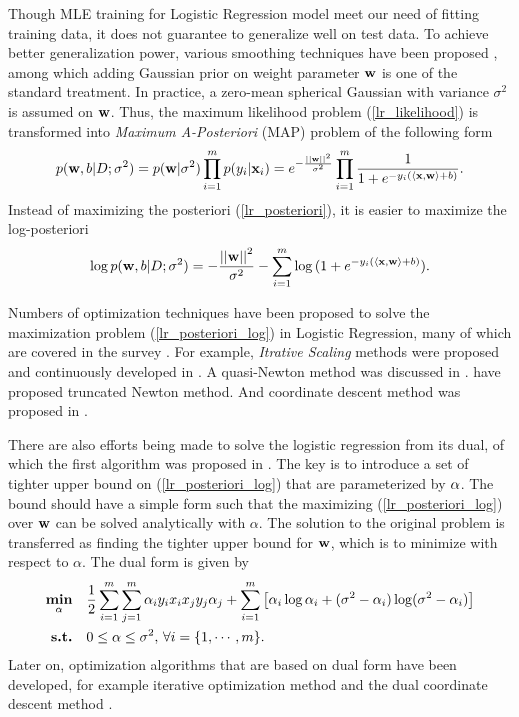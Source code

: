 Though MLE training for Logistic Regression model meet our need of fitting training data, it does not guarantee to generalize well on test data.
To achieve better generalization power, various smoothing techniques have been proposed \citep{Chen99,Chen00,Goodman03}, among which adding Gaussian prior on weight parameter $\mathbf {w}$ is one of the standard treatment.
In practice, a zero-mean spherical Gaussian with variance $\sigma^2$ is assumed on $\mathbf {w}$.
Thus, the maximum likelihood problem (\ref{lr_likelihood}) is transformed into \textit{Maximum A-Posteriori} (MAP) problem of the following form
\begin{align}
	p(\mathbf {w},b|D;\sigma^2) = p(\mathbf {w}|\sigma^2)\prod_{i=1}^mp(y_i|\mathbf {x}_i)=e^{ -\frac{\left|\left| \mathbf {w} \right|\right|^2}{\sigma^2} }\prod_{i=1}^{m}{\frac{1}{1+e^{ -y_i(\langle \mathbf {x}, \mathbf {w} \rangle+b) }}}. \label{lr_posteriori}
\end{align}
Instead of maximizing the posteriori (\ref{lr_posteriori}), it is easier to maximize the log-posteriori
\begin{align}
	\log p(\mathbf {w},b|D;\sigma^2) = -{\frac{\left|\left| \mathbf {w} \right|\right|^2}{\sigma^2}} - \sum_{i=1}^{m}\log{(1+e^{ -y_i(\langle \mathbf {x}, \mathbf {w}\rangle+b) })}. \label{lr_posteriori_log}
\end{align}

Numbers of optimization techniques have been proposed to solve the maximization problem (\ref{lr_posteriori_log}) in Logistic Regression, many of which are covered in the survey \citep{Minka03}.
For example, \textit{Itrative Scaling} methods were proposed and continuously developed in \citep{Darroch72,Pietra97,Berger97,Goodman02Sequential,Jin03a}.
A quasi-Newton method was discussed in \citep{Minka03}.
\citet{Komarek05making,Lin2008trust} have proposed truncated Newton method.
And coordinate descent method was proposed in \citep{Huang09iterative}.

There are also efforts being made to solve the logistic regression from its dual, of which the first algorithm was proposed in \citep{Jaakkola99probabilistic}.
The key is to introduce a set of tighter upper bound on (\ref{lr_posteriori_log}) that are parameterized by $\mathbf {\alpha}$.
The bound should have a simple form such that the maximizing (\ref{lr_posteriori_log}) over $\mathbf {w}$ can be solved analytically with $\alpha$.
The solution to the original problem is transferred as finding the tighter upper bound for  $\mathbf {w}$, which is to minimize with respect to $\alpha$.
The dual form is given by 
\begin{align*}
	\underset{\mathbf {\alpha}}{\textbf{min}} & \quad\frac{1}{2}\sum_{i=1}^{m}\sum_{j=1}^{m}\mathbf {\alpha}_iy_ix_ix_jy_j\mathbf {\alpha}_j + \sum_{i=1}^{m}\left[\mathbf {\alpha}_i\log\alpha_i+(\sigma^2-\mathbf {\alpha}_i)\log(\sigma^2-\mathbf {\alpha}_i)\right] \\
	\textbf{s.t.} &\quad 0\le\alpha\le\sigma^2, \, \forall i=\{1,\cdots,m\}.
\end{align*}
Later on, optimization algorithms that are based on dual form have been developed, for example iterative optimization method \citep{Keerthi05a} and the dual coordinate descent method \citep{Yu11dual}.

